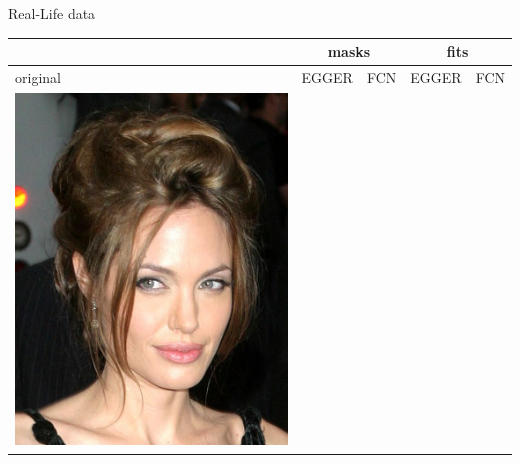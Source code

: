 \documentclass{beamer}
\begin{document}
\begin{frame}[c]{Real-Life data}
	\begin{table}[h!]
		\centering
		\noindent\begin{tabular}{ | m{1.8cm} | m{1.8cm} | m{1.8cm}| m{1.8cm} | m{1.8cm} |}
			\hline
			 & \multicolumn{2}{c|}{\bfseries masks} & \multicolumn{2}{c|}{\bfseries fits} \\ \hline
			original & EGGER & FCN & EGGER & FCN\\ \hline
			
			\begin{minipage}{1.8cm}
				\centering
				\vspace{1pt}
				\includegraphics[width=\linewidth]{realLife/test0.png}
				\vspace{1pt}
			\end{minipage}
			&
			\begin{minipage}{1.8cm}
				\centering
				\vspace{1pt}

\end{minipage}
\end{tabular}
\end{table}
\end{frame}
\end{document}

